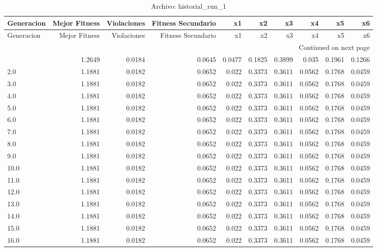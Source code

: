 \begin{longtable}{lrrrrrrrrr}
\caption{Archivo: historial\_run\_1}\label{tab:historial_run_1} \\
\toprule
Generacion & Mejor Fitness & Violaciones & Fitness Secundario & x1 & x2 & x3 & x4 & x5 & x6 \\
\midrule
\endfirsthead
\toprule
Generacion & Mejor Fitness & Violaciones & Fitness Secundario & x1 & x2 & x3 & x4 & x5 & x6 \\
\midrule
\endhead
\midrule
\multicolumn{10}{r}{Continued on next page} \\
\midrule
\endfoot
\bottomrule
\endlastfoot
1.0 & 1.2649 & 0.0184 & 0.0645 & 0.0477 & 0.1825 & 0.3899 & 0.035 & 0.1961 & 0.1266 \\
2.0 & 1.1881 & 0.0182 & 0.0652 & 0.022 & 0.3373 & 0.3611 & 0.0562 & 0.1768 & 0.0459 \\
3.0 & 1.1881 & 0.0182 & 0.0652 & 0.022 & 0.3373 & 0.3611 & 0.0562 & 0.1768 & 0.0459 \\
4.0 & 1.1881 & 0.0182 & 0.0652 & 0.022 & 0.3373 & 0.3611 & 0.0562 & 0.1768 & 0.0459 \\
5.0 & 1.1881 & 0.0182 & 0.0652 & 0.022 & 0.3373 & 0.3611 & 0.0562 & 0.1768 & 0.0459 \\
6.0 & 1.1881 & 0.0182 & 0.0652 & 0.022 & 0.3373 & 0.3611 & 0.0562 & 0.1768 & 0.0459 \\
7.0 & 1.1881 & 0.0182 & 0.0652 & 0.022 & 0.3373 & 0.3611 & 0.0562 & 0.1768 & 0.0459 \\
8.0 & 1.1881 & 0.0182 & 0.0652 & 0.022 & 0.3373 & 0.3611 & 0.0562 & 0.1768 & 0.0459 \\
9.0 & 1.1881 & 0.0182 & 0.0652 & 0.022 & 0.3373 & 0.3611 & 0.0562 & 0.1768 & 0.0459 \\
10.0 & 1.1881 & 0.0182 & 0.0652 & 0.022 & 0.3373 & 0.3611 & 0.0562 & 0.1768 & 0.0459 \\
11.0 & 1.1881 & 0.0182 & 0.0652 & 0.022 & 0.3373 & 0.3611 & 0.0562 & 0.1768 & 0.0459 \\
12.0 & 1.1881 & 0.0182 & 0.0652 & 0.022 & 0.3373 & 0.3611 & 0.0562 & 0.1768 & 0.0459 \\
13.0 & 1.1881 & 0.0182 & 0.0652 & 0.022 & 0.3373 & 0.3611 & 0.0562 & 0.1768 & 0.0459 \\
14.0 & 1.1881 & 0.0182 & 0.0652 & 0.022 & 0.3373 & 0.3611 & 0.0562 & 0.1768 & 0.0459 \\
15.0 & 1.1881 & 0.0182 & 0.0652 & 0.022 & 0.3373 & 0.3611 & 0.0562 & 0.1768 & 0.0459 \\
16.0 & 1.1881 & 0.0182 & 0.0652 & 0.022 & 0.3373 & 0.3611 & 0.0562 & 0.1768 & 0.0459 \\

\end{longtable}
